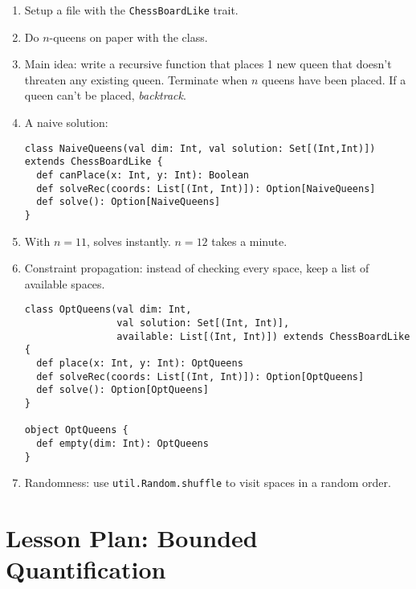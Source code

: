 \documentclass[9pt]{extbook}
\begin{document}
\begin{enumerate}

  \item Setup a file with the \lstinline|ChessBoardLike| trait.

  \item Do $n$-queens on paper with the class.

  \item Main idea: write a recursive function that places 1 new queen that
  doesn't threaten any existing queen. Terminate when $n$ queens have been
  placed. If a queen can't be placed, \emph{backtrack}.

  \item A naive solution:

\begin{lstlisting}
class NaiveQueens(val dim: Int, val solution: Set[(Int,Int)]) extends ChessBoardLike {
  def canPlace(x: Int, y: Int): Boolean 
  def solveRec(coords: List[(Int, Int)]): Option[NaiveQueens]
  def solve(): Option[NaiveQueens]   
}
\end{lstlisting}

  \item With $n = 11$, solves instantly. $n = 12$ takes a minute.

  \item Constraint propagation: instead of checking every space, keep a list
  of available spaces.

\begin{lstlisting}
class OptQueens(val dim: Int, 
                val solution: Set[(Int, Int)], 
                available: List[(Int, Int)]) extends ChessBoardLike {
  def place(x: Int, y: Int): OptQueens
  def solveRec(coords: List[(Int, Int)]): Option[OptQueens]
  def solve(): Option[OptQueens]
}

object OptQueens {
  def empty(dim: Int): OptQueens
}  
\end{lstlisting}

  \item Randomness: use \lstinline|util.Random.shuffle| to visit spaces in a random
  order.

\end{enumerate}

\chapter{Lesson Plan: Bounded Quantification}
\end{document}
